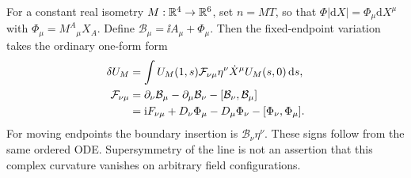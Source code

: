 For a constant real isometry $M:\mathbb R^4\to\mathbb R^6$, set
$n=M T$, so that $\Phi|\mathrm dX|=\Phi_\mu\mathrm dX^\mu$ with
$\Phi_\mu=M^A{}_{\mu}X_A$. Define
$\mathcal B_\mu=\ii A_\mu+\Phi_\mu$. Then the fixed-endpoint variation
takes the ordinary one-form form
\begin{align}\label{eq:complex-curvature}
 \delta U_M&=\int U_M(1,s)\mathcal F_{\nu\mu}
             \eta^\nu\dot X^\mu U_M(s,0)\,\mathrm d s,\notag\\
 \mathcal F_{\nu\mu}
 &=\partial_\nu\mathcal B_\mu-\partial_\mu\mathcal B_\nu
   -[\mathcal B_\nu,\mathcal B_\mu]\notag\\
 &=\mathrm i F_{\nu\mu}+D_\nu\Phi_\mu-D_\mu\Phi_\nu-[\Phi_\nu,\Phi_\mu].
\end{align}
For moving endpoints the boundary insertion is
$\mathcal B_\nu\eta^\nu$. These signs follow from the same ordered ODE.
Supersymmetry of the line is not an assertion that this complex
curvature vanishes on arbitrary field configurations.

